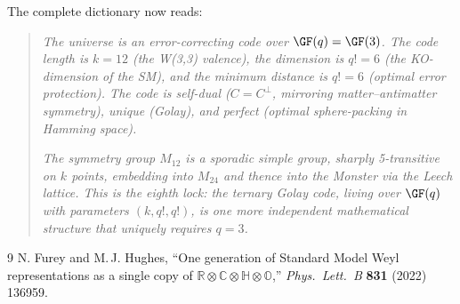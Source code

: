 The complete dictionary now reads:
\begin{quote}
\emph{The universe is an error-correcting code over $\GF(q)=\GF(3)$.
The code length is $k=12$ (the W(3,3) valence),
the dimension is $q!=6$ (the KO-dimension of the SM),
and the minimum distance is $q!=6$ (optimal error protection).
The code is self-dual ($C=C^\perp$, mirroring matter--antimatter
symmetry), unique (Golay), and perfect (optimal sphere-packing
in Hamming space).}

\emph{The symmetry group $M_{12}$ is a sporadic simple group,
sharply 5-transitive on $k$ points, embedding into $M_{24}$
and thence into the Monster via the Leech lattice.
This is the eighth lock: the ternary Golay code,
living over $\GF(q)$ with parameters $(k, q!, q!)$,
is one more independent mathematical structure that
uniquely requires $q=3$.}
\end{quote}

\begin{thebibliography}{9}
 N. Furey and M.\,J. Hughes,
  ``One generation of Standard Model Weyl representations as a
  single copy of $\mathbb{R}\otimes\mathbb{C}\otimes\mathbb{H}
  \otimes\mathbb{O}$,'' \emph{Phys.\ Lett.\ B} \textbf{831} (2022) 136959.
\end{thebibliography}
